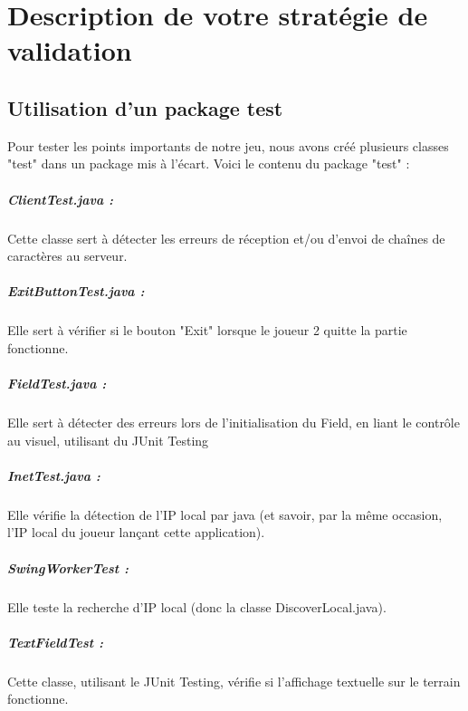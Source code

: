 \chapter{Description de votre stratégie de validation}

\section{Utilisation d'un package test}

Pour tester les points importants de notre jeu, nous avons créé plusieurs classes "test" dans un package mis à l'écart. Voici le contenu du package "test" :

\paragraph*{ClientTest.java :}
Cette classe sert à détecter les erreurs de réception et/ou d'envoi de chaînes de caractères au serveur.  

\paragraph*{ExitButtonTest.java :} Elle sert à vérifier si le bouton "Exit" lorsque le joueur 2 quitte la partie fonctionne.

\paragraph*{FieldTest.java :} Elle sert à détecter des erreurs lors de l'initialisation du Field, en liant le contrôle au visuel, utilisant du JUnit Testing

\paragraph*{InetTest.java :} Elle vérifie la détection de l'IP local par java (et savoir, par la même occasion, l'IP local du joueur lançant cette application).


\paragraph*{SwingWorkerTest :} Elle teste la recherche d'IP local (donc la classe DiscoverLocal.java).

\paragraph*{TextFieldTest :} Cette classe, utilisant le JUnit Testing, vérifie si l'affichage textuelle sur le terrain fonctionne. 

